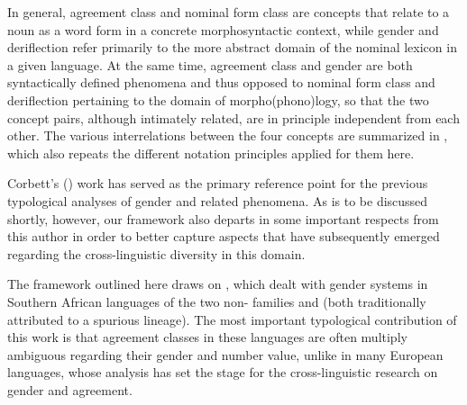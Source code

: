 \documentclass[output=collectionpaper]{langsci/langscibook}
\begin{document}
In general, agreement class and nominal form class are concepts that relate to a noun as a word form in a concrete morphosyntactic context, while gender and deriflection refer primarily to the more abstract domain of the nominal lexicon in a given language. At the same time, agreement class and gender are both syntactically defined phenomena and thus opposed to nominal form class and deriflection pertaining to the domain of morpho(phono)logy, so that the two concept pairs, although intimately related, are in principle independent from each other. The various interrelations between the four concepts are summarized in , which also repeats the different notation principles applied for them here.


Corbett's (\citeyear{Corbett1991,Corbett2000,Corbett2006}) work has served as the primary reference point for the previous typological analyses of gender and related phenomena. As is to be discussed shortly, however, our framework also departs in some important respects from this author in order to better capture aspects that have subsequently emerged regarding the cross-linguistic diversity in this domain.

The framework outlined here draws on \citet{Gueldemann2000}, which dealt with gender systems in Southern African languages of the two non- families  and  (both traditionally attributed to a spurious  lineage). The most important typological contribution of this work is that agreement classes in these languages are often multiply ambiguous regarding their gender and number value, unlike in many European languages, whose analysis has set the stage for the cross-linguistic research on gender and agreement.
\end{document}
